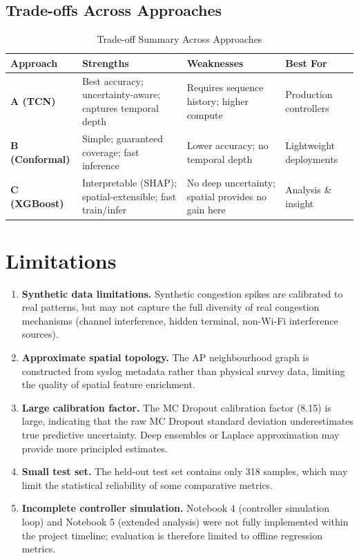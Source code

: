 \documentclass[12pt,a4paper]{article}
\begin{document}
\subsection{Trade-offs Across Approaches}

\begin{table}[H]
\centering
\caption{Trade-off Summary Across Approaches}
\label{tab:tradeoffs}
\renewcommand{\arraystretch}{1.35}
\begin{tabularx}{\linewidth}{>{\bfseries}l X X l}
\toprule
\textbf{Approach} & \textbf{Strengths} & \textbf{Weaknesses} & \textbf{Best For} \\
\midrule
A (TCN)        & Best accuracy; uncertainty-aware; captures temporal depth   & Requires sequence history; higher compute          & Production controllers \\
B (Conformal)  & Simple; guaranteed coverage; fast inference                 & Lower accuracy; no temporal depth                  & Lightweight deployments \\
C (XGBoost)    & Interpretable (SHAP); spatial-extensible; fast train/infer  & No deep uncertainty; spatial provides no gain here & Analysis \& insight \\
\bottomrule
\end{tabularx}
\end{table}

\section{Limitations}
\label{sec:limitations}

\begin{enumerate}[noitemsep, topsep=4pt]
    \item \textbf{Synthetic data limitations.} Synthetic congestion spikes are calibrated to real patterns, but may not capture the full diversity of real congestion mechanisms (channel interference, hidden terminal, non-Wi-Fi interference sources).
    \item \textbf{Approximate spatial topology.} The AP neighbourhood graph is constructed from syslog metadata rather than physical survey data, limiting the quality of spatial feature enrichment.
    \item \textbf{Large calibration factor.} The MC Dropout calibration factor (8.15) is large, indicating that the raw MC Dropout standard deviation underestimates true predictive uncertainty. Deep ensembles or Laplace approximation may provide more principled estimates.
    \item \textbf{Small test set.} The held-out test set contains only 318 samples, which may limit the statistical reliability of some comparative metrics.
    \item \textbf{Incomplete controller simulation.} Notebook 4 (controller simulation loop) and Notebook 5 (extended analysis) were not fully implemented within the project timeline; evaluation is therefore limited to offline regression metrics.
\end{enumerate}
\end{document}
